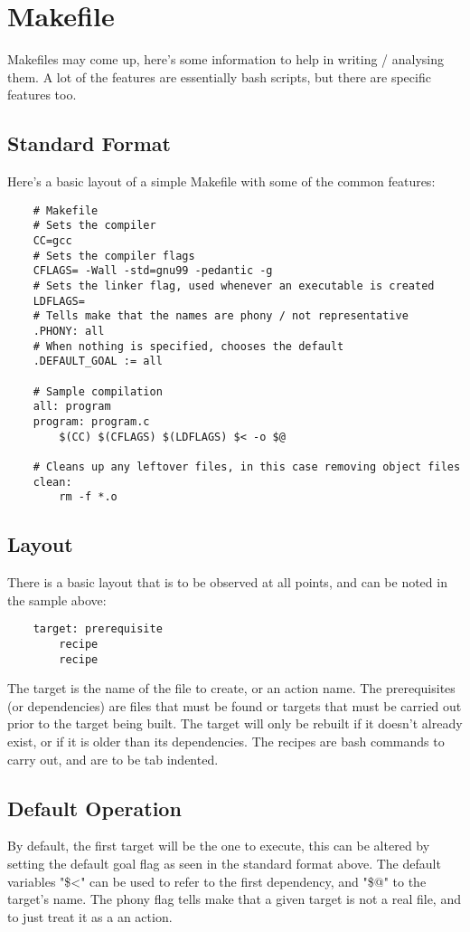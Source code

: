\documentclass{article}
\begin{document}
\newpage
\section{Makefile}
Makefiles may come up, here's some information to help in writing / analysing them. A lot of the features are essentially bash scripts, but there are specific features too.

\subsection{Standard Format}
Here's a basic layout of a simple Makefile with some of the common features:
\begin{verbatim}
    # Makefile
    # Sets the compiler
    CC=gcc
    # Sets the compiler flags
    CFLAGS= -Wall -std=gnu99 -pedantic -g
    # Sets the linker flag, used whenever an executable is created
    LDFLAGS=
    # Tells make that the names are phony / not representative
    .PHONY: all
    # When nothing is specified, chooses the default
    .DEFAULT_GOAL := all

    # Sample compilation
    all: program
    program: program.c
        $(CC) $(CFLAGS) $(LDFLAGS) $< -o $@

    # Cleans up any leftover files, in this case removing object files
    clean:
        rm -f *.o
\end{verbatim}

\subsection{Layout}
There is a basic layout that is to be observed at all points, and can be noted in the sample above:
\begin{verbatim}
    target: prerequisite
        recipe
        recipe
\end{verbatim}
The target is the name of the file to create, or an action name. The prerequisites (or dependencies) are files that must be found or targets that must be carried out prior to the target being built. The target will only be rebuilt if it doesn't already exist, or if it is older than its dependencies. The recipes are bash commands to carry out, and are to be tab indented.

\subsection{Default Operation}
By default, the first target will be the one to execute, this can be altered by setting the default goal flag as seen in the standard format above. The default variables "\$\textless" can be used to refer to the first dependency, and "\$@" to the target's name. The phony flag tells make that a given target is not a real file, and to just treat it as a an action.
\end{document}
